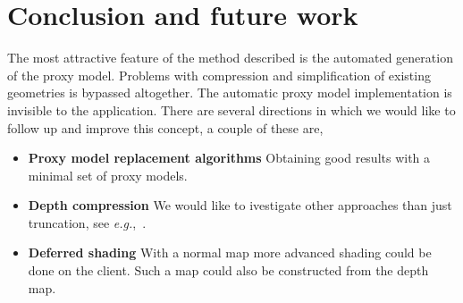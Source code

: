 \documentclass[10pt,conference,compsocconf]{IEEEtran}
\newcommand{\eg}{{\em e.g.}}
\begin{document}
\section{Conclusion and future work}

The most attractive feature of the method described is the automated generation
of the proxy model. Problems with compression and simplification of existing
geometries is bypassed altogether. The automatic proxy model implementation is
invisible to the application. There are several directions in which we would
like to follow up and improve this concept, a couple of these are,
\begin{itemize}

\item \textbf{Proxy model replacement algorithms} Obtaining good results with a minimal set of
proxy models.

\item \textbf{Depth compression} We would like to ivestigate other approaches
than just truncation, see \eg,~\cite{DBLP:journals/tvcg/Lindstrom14}.

\item \textbf{Deferred shading} With a normal map more advanced
shading could be done on the client. Such a map could also be constructed from
the depth map.

\end{itemize}








%








\end{document}
